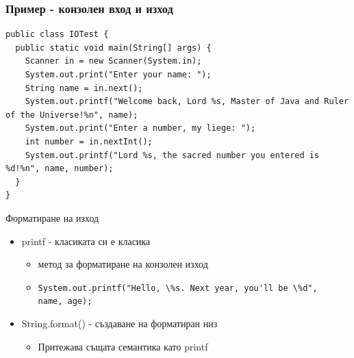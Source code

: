 \documentclass{beamer}
\begin{document}
\begin{frame}[fragile]
  \frametitle{Пример - конзолен вход и изход}
  \transdissolve
\begin{lstlisting}
public class IOTest {
  public static void main(String[] args) {
    Scanner in = new Scanner(System.in);
    System.out.print("Enter your name: ");
    String name = in.next();
    System.out.printf("Welcome back, Lord %s, Master of Java and Ruler of the Universe!%n", name);
    System.out.print("Enter a number, my liege: ");
    int number = in.nextInt();
    System.out.printf("Lord %s, the sacred number you entered is %d!%n", name, number);
  }
}  
\end{lstlisting}
\end{frame}

\begin{frame}{Форматиране на изход}
  \transdissolve
  \begin{itemize}
  \item printf - класиката си е класика \pause
    \begin{itemize}
      \item метод за форматиране на конзолен изход \pause
      \item \lstinline{System.out.printf("Hello, \%s. Next year, you'll be \%d",
        name, age);} \pause
    \end{itemize}
  \item String.format() - създаване на форматиран низ \pause
    \begin{itemize}
      \item Притежава същата семантика като printf
    \end{itemize}
  \end{itemize}
\end{frame}
\end{document}

